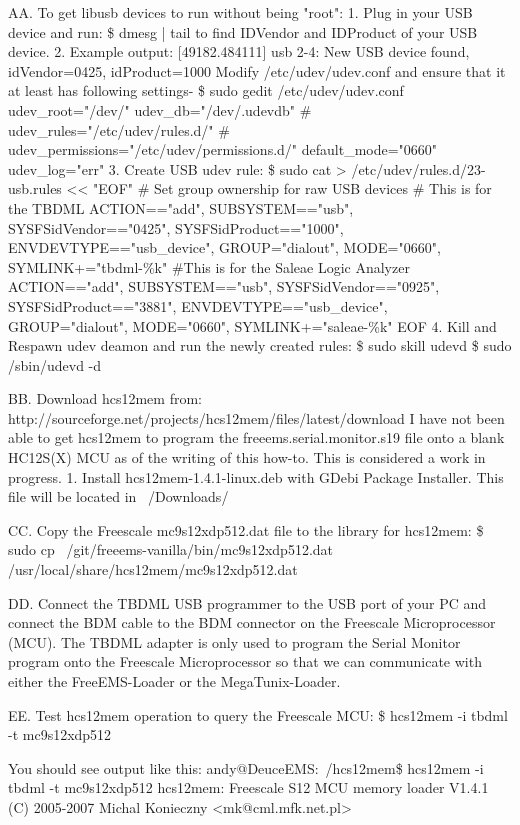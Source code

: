 \documentclass[12pt,notitlepage,onecolumn,oneside,draft]{memoir}
\begin{document}
AA. To get libusb devices to run without being "root":
1. Plug in your USB device and run:
\$ dmesg | tail
to find IDVendor and IDProduct of your USB device.
2. Example output:
[49182.484111] usb 2-4: New USB device found, idVendor=0425, idProduct=1000
Modify /etc/udev/udev.conf and ensure that it at least has following settings-
\$ sudo gedit /etc/udev/udev.conf		
udev_root="/dev/"
udev_db="/dev/.udevdb"
# udev_rules="/etc/udev/rules.d/"
# udev_permissions="/etc/udev/permissions.d/"
default_mode="0660"
udev_log="err"
3. Create USB udev rule:
\$ sudo cat > /etc/udev/rules.d/23-usb.rules << "EOF"
# Set group ownership for raw USB devices
# This is for the TBDML
ACTION=="add", SUBSYSTEM=="usb", SYSFS{idVendor}=="0425", SYSFS{idProduct}=="1000", ENV{DEVTYPE}=="usb_device", GROUP="dialout", MODE="0660", SYMLINK+="tbdml-\%k"
#This is for the Saleae Logic Analyzer 
ACTION=="add", SUBSYSTEM=="usb", SYSFS{idVendor}=="0925", SYSFS{idProduct}=="3881", ENV{DEVTYPE}=="usb_device", GROUP="dialout", MODE="0660", SYMLINK+="saleae-\%k"
EOF
4. Kill and Respawn udev deamon and run the newly created rules:
\$ sudo skill udevd
\$ sudo /sbin/udevd -d

BB. Download hcs12mem from:
	http://sourceforge.net/projects/hcs12mem/files/latest/download
	I have not been able to get hcs12mem to program the freeems.serial.monitor.s19 file onto a blank 	HC12S(X) MCU as of the writing of this how-to.  This is considered a work in progress.
1. Install hcs12mem-1.4.1-linux.deb with GDebi Package Installer. This file will be located in ~/Downloads/

CC. Copy the Freescale mc9s12xdp512.dat file to the library for hcs12mem:
	\$ sudo cp ~/git/freeems-vanilla/bin/mc9s12xdp512.dat /usr/local/share/hcs12mem/mc9s12xdp512.dat

DD. Connect the TBDML USB programmer to the USB port of your PC and connect the BDM cable to the BDM connector on the Freescale Microprocessor (MCU).  The TBDML adapter is only used to program the Serial Monitor program onto the Freescale Microprocessor so that we can communicate with either the FreeEMS-Loader or the MegaTunix-Loader.

EE. Test hcs12mem operation to query the Freescale MCU:
	\$ hcs12mem -i tbdml -t mc9s12xdp512

	You should see output like this:
	andy@DeuceEMS:~/hcs12mem\$ hcs12mem -i tbdml -t mc9s12xdp512
	hcs12mem: Freescale S12 MCU memory loader V1.4.1 (C) 2005-2007 Michal Konieczny 	<mk@cml.mfk.net.pl>
\end{document}

